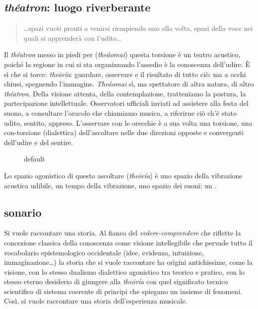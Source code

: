 \documentclass{gs}
\begin{document}
\subsection*{\emph{théatron}: luogo riverberante}

\begin{quote}
\ldots spazi vuoti pronti a venirsi riempiendo uno alla volta, spazi della voce nei quali si apprenderà con l'udito\ldots~\cite{zambrano1991}
\end{quote}

Il \emph{théatron} messo in piedi per (\emph{theáomai}) questa torsione è un teatro acustico, poiché la regione in cui si sta organizzando l'assedio è la conoscenza dell'udire. È sì che si torce: \emph{theōría}: guardare, osservare e il risultato di tutto ciò: ma a occhi chiusi, spegnendo l'immagine. \emph{Theáomai} sì, ma spettatore di altra natura, di altro \emph{théatron}. Della visione attenta, della contemplazione, tratteniamo la postura, la partecipazione intellettuale. Osservatori ufficiali inviati ad assistere alla festa del suono, a consultare l'oracolo che chiamiamo musica, a riferirne ciò ch'è stato udito, sentito, appreso.  L'osservare con le orecchie è a sua volta una torsione, una con-torsione (dialettica) dell'ascoltare nelle due direzioni opposte e convergenti dell'udire e del sentire.

\begin{figure}[htbp]
\begin{center}
\caption{default}
\label{default}
\end{center}
\end{figure}

Lo spazio agonistico \cite{ronchi2001} di questo ascoltare (\emph{theōría}) è uno spazio della vibrazione acustica udibile, un tempo della vibrazione, uno spazio dei suoni: un . 

\subsection*{sonario}

Si vuole raccontare una storia. Al fianco del \emph{vedere-comprendere} che riflette la concezione classica della conoscenza come visione intellegibile che pervade tutto il vocabolario epistemologico occidentale (idee, evidenza, intuizione, immaginazione\ldots) la storia che si vuole raccontare ha origini antichissime, come la visione, con lo stesso dualismo dialettico agonistico tra teorico e pratico, con lo stesso eterno desiderio di giungere alla \emph{theōría} con quel significato tecnico scientifico di sistema coerente di principi che spiegano un insieme di fenomeni. Così, si vuole raccontare una storia dell'esperienza musicale.
\end{document}
